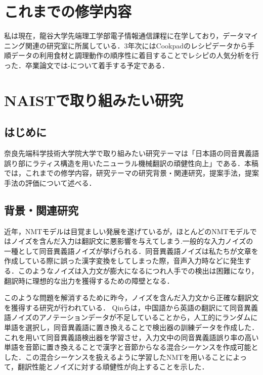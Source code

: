 \documentclass[a4j,10pt, twocolumn]{jarticle} \usepackage[dvipdfmx]{graphicx} \usepackage{amssymb} \usepackage{amsmath}
\begin{document}

\section{これまでの修学内容}
私は現在，龍谷大学先端理工学部電子情報通信課程に在学しており，データマイニング関連の研究室に所属している．3年次にはCookpadのレシピデータから手順データの利用食材と調理動作の順序性に着目することでレシピの人気分析を行った．卒業論文では-について着手する予定である．
\section{NAISTで取り組みたい研究}
\subsection{はじめに}
奈良先端科学技術大学院大学で取り組みたい研究テーマは「日本語の同音異義語誤り部にラティス構造を用いたニューラル機械翻訳の頑健性向上」である．本稿では，これまでの修学内容，研究テーマの研究背景・関連研究，提案手法，提案手法の評価について述べる．

\subsection{背景・関連研究}
近年，NMTモデルは目覚ましい発展を遂げているが，ほとんどのNMTモデルではノイズを含んだ入力は翻訳文に悪影響を与えてしまう\cite{Belinkov}.一般的な入力ノイズの一種として同音異義語ノイズが挙げられる．同音異義語ノイズは私たちが文章を作成している際に誤った漢字変換をしてしまった際，音声入力時などに発生する．このようなノイズは入力文が膨大になるにつれ人手での検出は困難になり，翻訳時に理想的な出力を獲得するための障壁となる．

このような問題を解消するために昨今，ノイズを含んだ入力文から正確な翻訳文を獲得する研究が行われている．
Qinら\cite{Qin}は，中国語から英語の翻訳にて同音異義語ノイズのアノテーションデータが不足していることから，人工的にランダムに単語を選択し，同音異義語に置き換えることで検出器の訓練データを作成した．これを用いて同音異義語検出器を学習させ，入力文中の同音異義語誤り率の高い単語を音節に置き換えることで漢字と音節からなる混合シーケンスを作成可能とした．この混合シーケンスを扱えるように学習したNMTを用いることによって，翻訳性能とノイズに対する頑健性が向上することを示した．
\end{document}
